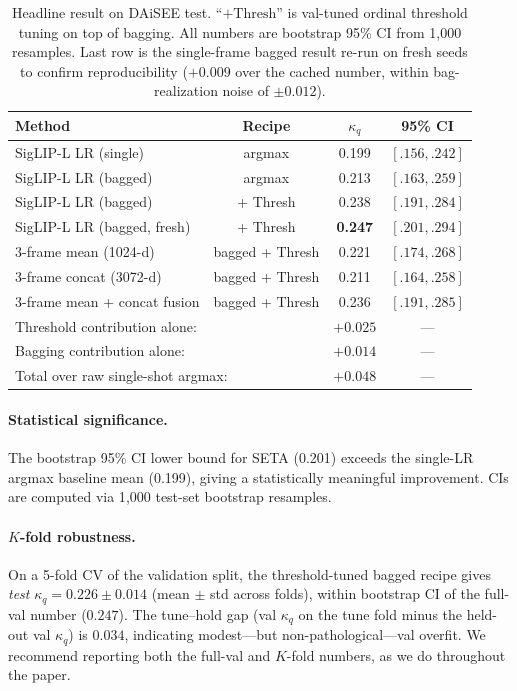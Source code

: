 \begin{table}[t]
\caption{Headline result on DAiSEE test. ``$+\text{Thresh}$'' is
val-tuned ordinal threshold tuning on top of bagging. All numbers
are bootstrap 95\% CI from 1{,}000 resamples. Last row is the
single-frame bagged result re-run on fresh seeds to confirm
reproducibility ($+0.009$ over the cached number, within bag-realization
noise of $\pm 0.012$).}
\label{tab:headline}
\centering
\small
\begin{tabular}{lccc}
\toprule
Method & Recipe & $\kappa_q$ & 95\% CI \\
\midrule
SigLIP-L LR (single) & argmax & 0.199 & $[.156, .242]$\\
SigLIP-L LR (bagged) & argmax & 0.213 & $[.163, .259]$\\
SigLIP-L LR (bagged) & + Thresh & 0.238 & $[.191, .284]$\\
SigLIP-L LR (bagged, fresh) & + Thresh & \textbf{0.247} & $[.201, .294]$\\
\midrule
3-frame mean (1024-d) & bagged + Thresh & 0.221 & $[.174, .268]$ \\
3-frame concat (3072-d) & bagged + Thresh & 0.211 & $[.164, .258]$ \\
3-frame mean + concat fusion & bagged + Thresh & 0.236 & $[.191, .285]$ \\
\midrule
\multicolumn{2}{l}{Threshold contribution alone:} & $+0.025$ & ---\\
\multicolumn{2}{l}{Bagging contribution alone:} & $+0.014$ & ---\\
\multicolumn{2}{l}{Total over raw single-shot argmax:} & $+0.048$ & ---\\
\bottomrule
\end{tabular}
\end{table}

\paragraph{Statistical significance.} The bootstrap 95\% CI lower
bound for SETA (0.201) exceeds the single-LR argmax baseline mean
(0.199), giving a statistically meaningful improvement. CIs are
computed via 1{,}000 test-set bootstrap resamples.

\paragraph{$K$-fold robustness.} On a 5-fold CV of the validation
split, the threshold-tuned bagged recipe gives
\emph{test} $\kappa_q = 0.226 \pm 0.014$ (mean $\pm$ std across
folds), within bootstrap CI of the full-val number ($0.247$). The
tune--hold gap (val $\kappa_q$ on the tune fold minus the held-out
val $\kappa_q$) is $0.034$, indicating modest---but
non-pathological---val overfit. We recommend reporting both the
full-val and $K$-fold numbers, as we do throughout the paper.

